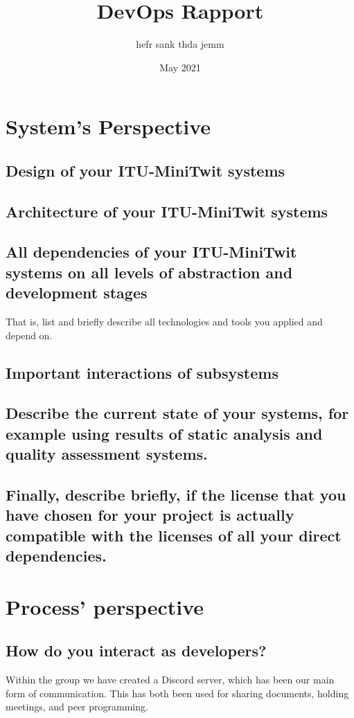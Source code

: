 \documentclass{article}
\title{DevOps Rapport}
\author{hefr sank thda jemm}
\date{May 2021}
\begin{document}
\maketitle

\section{System's Perspective}

\subsection{Design of your ITU-MiniTwit systems}

\subsection{Architecture of your ITU-MiniTwit systems}

\subsection{All dependencies of your ITU-MiniTwit systems on all levels of abstraction and development stages}
That is, list and briefly describe all technologies and tools you applied and depend on.

\subsection{Important interactions of subsystems}

\subsection{Describe the current state of your systems, for example using results of static analysis and quality assessment systems.}


\subsection{Finally, describe briefly, if the license that you have chosen for your project is actually compatible with the licenses of all your direct dependencies.}


\section{Process' perspective}

\subsection{How do you interact as developers?}
Within the group we have created a Discord server, which has been our main form of communication. This has both been used for sharing documents, holding meetings, and peer programming.
\end{document}
